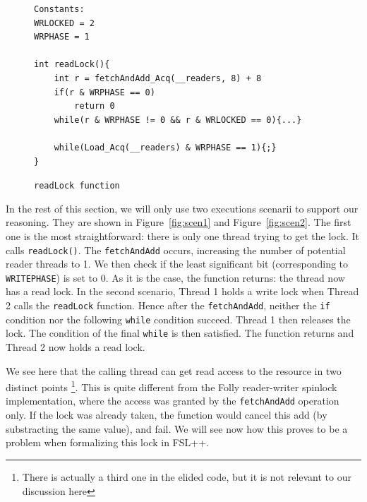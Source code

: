 \begin{figure}
		\begin{lstlisting}
Constants:
WRLOCKED = 2
WRPHASE = 1

int readLock(){
	int r = fetchAndAdd_Acq(__readers, 8) + 8
	if(r & WRPHASE == 0)
		return 0
	while(r & WRPHASE != 0 && r & WRLOCKED == 0){...}

	while(Load_Acq(__readers) & WRPHASE == 1){;}
}

	\end{lstlisting}
	\caption{\texttt{readLock function}}
	\label{fig:codeglibc}
\end{figure}
In the rest of this section, we will only use two executions scenarii to support our reasoning. They are shown in Figure~\ref{fig:scen1} and Figure~\ref{fig:scen2}. The first one is the most straightforward: there is only one thread trying to get the lock. It calls \texttt{readLock()}. The \texttt{fetchAndAdd} occurs, increasing the number of potential reader threads to 1. We then check if the least significant bit (corresponding to \texttt{WRITEPHASE}) is set to 0. As it is the case, the function returns: the thread now has a read lock. In the second scenario, Thread 1 holds a write lock when Thread 2 calls the \texttt{readLock} function. Hence after the \texttt{fetchAndAdd}, neither the \texttt{if} condition nor the following \texttt{while} condition succeed. Thread 1 then releases the lock. The condition of the final \texttt{while} is then satisfied. The function returns and Thread 2 now holds a read lock.

We see here that the calling thread can get read access to the resource in two distinct points \footnote{There is actually a third one in the elided code, but it is not relevant to our discussion here}. This is quite different from the Folly reader-writer spinlock implementation, where the access was granted by the \texttt{fetchAndAdd} operation only. If the lock was already taken, the function would cancel this add (by substracting the same value), and fail. We will see now how this proves to be a problem when formalizing this lock in FSL++.


